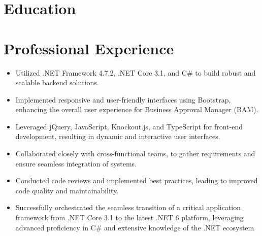 \documentclass[1pt,a4paper,verdana]{moderncv} %
\title{}
\begin{document}
\makecvtitle %


\section{Education}



\section{Professional Experience}
	{\begin{itemize}
	\item Utilized .NET Framework 4.7.2, .NET Core 3.1, and C\# to build robust and scalable backend solutions.
	\item Implemented responsive and user-friendly interfaces using Bootstrap, enhancing the overall user experience for Business Approval Manager (BAM).
	\item Leveraged jQuery, JavaScript, Knockout.js, and TypeScript for front-end development, resulting in dynamic and interactive user interfaces.
	\item Collaborated closely with cross-functional teams, to gather requirements and ensure seamless integration of systems.
	\item Conducted code reviews and implemented best practices, leading to improved code quality and maintainability.
	\item Successfully orchestrated the seamless transition of a critical application framework from .NET Core 3.1 to the latest .NET 6 platform, leveraging advanced proficiency in C\# and extensive knowledge of the .NET ecosystem
\end{itemize}}
\end{document}
